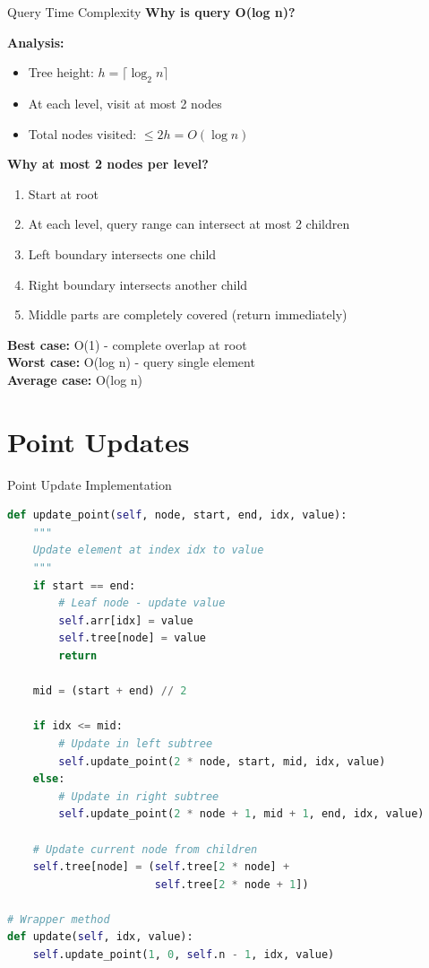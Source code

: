 \documentclass[aspectratio=169]{beamer}
\begin{document}
\begin{frame}{Query Time Complexity}
  \textbf{Why is query O(log n)?}

  \vspace{0.5cm}
  \textbf{Analysis:}
  \begin{itemize}
    \item Tree height: $h = \lceil \log_2 n \rceil$
    \item At each level, visit at most 2 nodes
    \item Total nodes visited: $\leq 2h = O(\log n)$
  \end{itemize}

  \vspace{0.5cm}
  \textbf{Why at most 2 nodes per level?}
  \begin{enumerate}
    \item Start at root
    \item At each level, query range can intersect at most 2 children
    \item Left boundary intersects one child
    \item Right boundary intersects another child
    \item Middle parts are completely covered (return immediately)
  \end{enumerate}

  \vspace{0.5cm}
  \textbf{Best case:} O(1) - complete overlap at root\\
  \textbf{Worst case:} O(log n) - query single element\\
  \textbf{Average case:} O(log n)
\end{frame}

\section{Point Updates}

\begin{frame}[fragile]{Point Update Implementation}
  \begin{lstlisting}[language=Python, basicstyle=\ttfamily\footnotesize]
def update_point(self, node, start, end, idx, value):
    """
    Update element at index idx to value
    """
    if start == end:
        # Leaf node - update value
        self.arr[idx] = value
        self.tree[node] = value
        return

    mid = (start + end) // 2

    if idx <= mid:
        # Update in left subtree
        self.update_point(2 * node, start, mid, idx, value)
    else:
        # Update in right subtree
        self.update_point(2 * node + 1, mid + 1, end, idx, value)

    # Update current node from children
    self.tree[node] = (self.tree[2 * node] +
                       self.tree[2 * node + 1])

# Wrapper method
def update(self, idx, value):
    self.update_point(1, 0, self.n - 1, idx, value)
  \end{lstlisting}
\end{frame}
\end{document}
